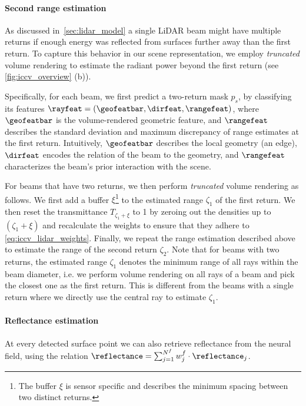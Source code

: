 \paragraph{Second range estimation}
As discussed in~\cref{sec:lidar_model} a single LiDAR beam might have multiple returns if enough energy was reflected from surfaces further away than the first return. To capture this behavior in our scene representation, we employ \textit{truncated} volume rendering to estimate the radiant power beyond the first return (see \cref{fig:iccv_overview} (b)).

Specifically, for each beam, we first predict a two-return mask $p_s$, by classifying its features $\rayfeat = (\geofeatbar,\dirfeat,\rangefeat)$, where $\geofeatbar$ is the volume-rendered geometric feature, and $\rangefeat$ describes the standard deviation and maximum discrepancy of range estimates at the first return. Intuitively, $\geofeatbar$ describes the local geometry (\eg an edge), $\dirfeat$ encodes the relation of the beam to the geometry, and $\rangefeat$ characterizes the beam's prior interaction with the scene.

For beams that have two returns, we then perform \textit{truncated} volume rendering as follows. We first add a buffer $\xi$\footnote{The buffer $\xi$ is sensor specific and describes the minimum spacing between two distinct returns.} to the estimated range $\zeta_1$ of the first return. We then reset the transmittance $T_{\zeta_1 + \xi}$ to 1 by zeroing out the densities up to $(\zeta_1 + \xi)$ and recalculate the weights to ensure that they adhere to \cref{eq:iccv_lidar_weights}. Finally, we repeat the range estimation described above to estimate the range of the second return $\zeta_2$. Note that for beams with two returns, the estimated range $\zeta_1$ denotes the minimum range of all rays within the beam diameter, i.e. we perform volume rendering on all rays of a beam and pick the closest one as the first return. This is different from the beams with a single return where we directly use the central ray to estimate $\zeta_1$. 






\paragraph{Reflectance estimation}
At every detected surface point we can also retrieve reflectance from the neural field, using the relation $\reflectance = \sum_{j=1}^{N^f} w_j^f \cdot \reflectance_j$.


